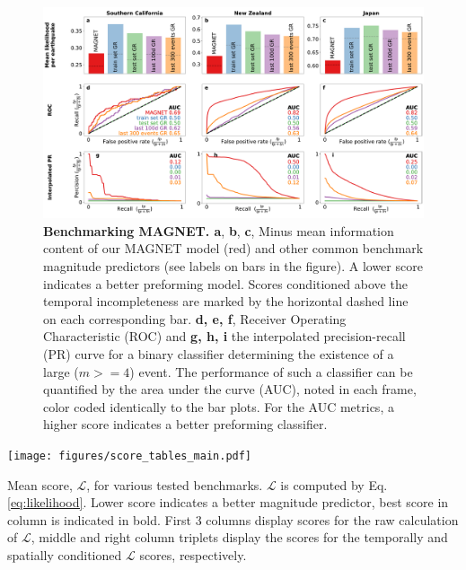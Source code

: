 \documentclass[pdflatex]{sn-jnl}
\begin{document}
\begin{figure}[h!]
    \centering
    \includegraphics[width=1\textwidth]{figures/combined_barplots.pdf}
    \caption{
        \textbf{Benchmarking MAGNET. a}, \textbf{b}, \textbf{c}, Minus mean information content of our MAGNET model (red) and other common benchmark magnitude predictors (see labels on bars in the figure). A lower score indicates a better preforming model. Scores conditioned above the temporal incompleteness are marked by the horizontal dashed line on each corresponding bar. \textbf{d, e, f}, Receiver Operating Characteristic (ROC) and \textbf{g, h, i} the interpolated precision-recall (PR) curve for a binary classifier determining the existence of a large ($m>=4$) event. The performance of such a classifier can be quantified by the area under the curve (AUC), noted in each frame, color coded identically to the bar plots. For the AUC metrics, a higher score indicates a better preforming classifier.
        }
        \label{fig:metrics}
\end{figure}


\begin{table}[h!]
    \centering
    \texttt{[image: figures/score\_tables\_main.pdf]}
    \caption{Mean score, $\mathcal{L}$, for various tested benchmarks. $\mathcal{L}$ is computed by Eq. \ref{eq:likelihood}. Lower score indicates a better magnitude predictor, best score in column is indicated in bold. First 3 columns display scores for the raw calculation of $\mathcal{L}$, middle and right column triplets display the scores for the temporally and spatially conditioned $\mathcal{L}$ scores, respectively.
    }
    \label{tab:mean_ll_benchmarks_main_text}
\end{table}
   
\end{document}
